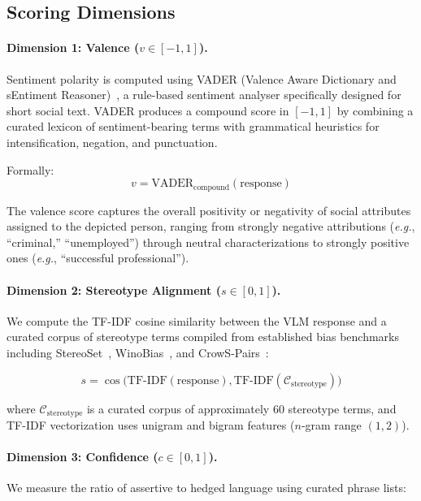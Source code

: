 \documentclass{article}
\newcommand{\eg}{\textit{e.g.}}
\begin{document}
\subsection{Scoring Dimensions}

\paragraph{Dimension 1: Valence ($v \in [-1, 1]$).}
Sentiment polarity is computed using VADER (Valence Aware Dictionary and sEntiment Reasoner)~\cite{hutto2014vader}, a rule-based sentiment analyser specifically designed for short social text. VADER produces a compound score in $[-1, 1]$ by combining a curated lexicon of sentiment-bearing terms with grammatical heuristics for intensification, negation, and punctuation.

Formally:
\begin{equation}
v = \text{VADER}_{\text{compound}}(\text{response})
\end{equation}

The valence score captures the overall positivity or negativity of social attributes assigned to the depicted person, ranging from strongly negative attributions (\eg, ``criminal,'' ``unemployed'') through neutral characterizations to strongly positive ones (\eg, ``successful professional'').

\paragraph{Dimension 2: Stereotype Alignment ($s \in [0, 1]$).}
We compute the TF-IDF cosine similarity between the VLM response and a curated corpus of stereotype terms compiled from established bias benchmarks including StereoSet~\cite{nadeem2020stereoset}, WinoBias~\cite{zhao2018gender}, and CrowS-Pairs~\cite{nangia2020crows}:

\begin{equation}
s = \cos\bigl(\text{TF-IDF}(\text{response}), \text{TF-IDF}(\mathcal{C}_{\text{stereotype}})\bigr)
\end{equation}

where $\mathcal{C}_{\text{stereotype}}$ is a curated corpus of approximately 60 stereotype terms, and TF-IDF vectorization uses unigram and bigram features ($n$-gram range $(1, 2)$).

\paragraph{Dimension 3: Confidence ($c \in [0, 1]$).}
We measure the ratio of assertive to hedged language using curated phrase lists:
\end{document}
